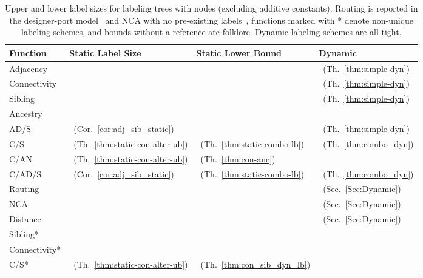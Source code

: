 \documentclass{llncs}
\begin{document}
\begin {table}[h]
	\begin{center}
	    \begin{tabular}{ | l | l | l | l | }
		    \hline
		   \textbf{Function } & \textbf{Static Label Size} & \textbf{Static Lower Bound}  & \textbf{Dynamic} \\ \hline\hline
		   Adjacency  	&~\cite{Alstrup02}  &  & {\color{blue} ~(Th.~\ref{thm:simple-dyn}}) \\ \hline
		   Connectivity  	&~\cite{Alstrup05} & ~\cite{Alstrup05}  &  {\color{blue} ~(Th.~\ref{thm:simple-dyn}}) \\ \hline
		   Sibling  		&~\cite{lewenstein2013succinct} & ~\cite{Alstrup05}  & {\color{blue} ~(Th.~\ref{thm:simple-dyn}}) \\ \hline
		   Ancestry   	&~\cite{Korman10} & ~\cite{Alstrup05} & ~\cite{cohen2010labeling} \\ \hline \hline
		  AD/S		& {\color{blue}  ~(Cor.~\ref{cor:adj_sib_static})}& 	~\cite{Alstrup05}& {\color{blue} ~(Th.~\ref{thm:simple-dyn})} \\ \hline
		   C/S  		& {\color{blue} ~(Th.~\ref{thm:static-con-alter-ub})} & ~(Th.~\ref{thm:static-combo-lb}) & {\color{blue} ~(Th.~\ref{thm:combo_dyn})} \\ \hline
		   C/AN   		&{\color{blue} ~(Th.~\ref{thm:static-con-alter-ub})} & {\color{blue} ~(Th.~\ref{thm:con-anc})} &  ~\cite{cohen2010labeling} \\ \hline
		   C/AD/S   	& {\color{blue} ~(Cor.~\ref{cor:adj_sib_static})} & {\color{blue} ~(Th.~\ref{thm:static-combo-lb})} & {\color{blue} ~(Th.~\ref{thm:combo_dyn})} \\ \hline	\hline
		   Routing   	&~\cite{Thorup01}   &~\cite{Alstrup05} & {\color{blue} ~(Sec.~\ref{Sec:Dynamic})}  \\  \hline
		   NCA   		&~\cite{alstrup2013near}  & ~\cite{alstrup2013near}  &  {\color{blue} ~(Sec.~\ref{Sec:Dynamic})} \\ \hline
		    Distance	& ~\cite{Peleg00}  & ~\cite{Peleg00}  & {\color{blue} ~(Sec.~\ref{Sec:Dynamic})} \\  \hline\hline
		    Sibling*  		&  &   &  \\ \hline
		   Connectivity*  	& &   &  \\ \hline
		    C/S*  	& {\color{blue} ~(Th.~\ref{thm:static-con-alter-ub})} & {\color{blue} ~(Th.~\ref{thm:con_sib_dyn_lb})}  &  \\ \hline
	    \end{tabular}
	 \end{center}
	 	 	\caption{Upper and lower  label sizes  for labeling  trees with  nodes (excluding additive constants).
			 Routing  is reported in the designer-port model~\cite{Fraigniaud01} and NCA with no pre-existing labels~\cite{alstrup2013near},
			 functions marked with * denote non-unique labeling schemes, and bounds without a reference are folklore.
			 Dynamic labeling schemes are all tight.}
	\label{table:complexities}
\end {table}
\end{document}
